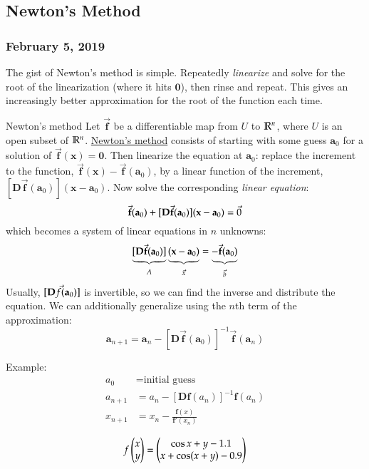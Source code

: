\subsection{Newton's Method}
\subsubsection*{February 5, 2019}

The gist of Newton's method is simple. Repeatedly \emph{linearize} and solve for the root of the linearization (where it hits $\bm{0}$), then rinse and repeat. This gives an increasingly better approximation for the root of the function each time. 

\begin{defn}{Newton's method}
Let $\vec{\bm{f}}$ be a differentiable map from $U$ to $\mathbb{R}^n$, where $U$ is an open subset of $\mathbb{R}^n$. \ul{Newton's method} consists of starting with some guess $\bm{a}_0$ for a solution of $\vec{\bm{f}}(\bm{x})=\bm{0}$. Then linearize the equation at $\bm{a}_0$: replace the increment to the function, $\vec{\bm{f}}(\bm{x})-\vec{\bm{f}}(\bm{a}_0)$, by a linear function of the increment, $[\bm{D}\vec{\bm{f}}(\bm{a}_0)](\bm{x}-\bm{a}_0)$. Now solve the corresponding \emph{linear equation}:
  \begin{equation}
  	\vec{\textbf{f}}(\textbf{a}_0)+[\textbf{D}\vec{\textbf{f}}(\textbf{a}_0)](\textbf{x}-\textbf{a}_0)=\Vec{0}
  \end{equation}
  which becomes a system of linear equations in $n$ unknowns: 
  \begin{equation}
  	\underbrace{[\textbf{D\ensuremath{\Vec{\textbf{f}}}}(\textbf{a}_0)]}_{A}\underbrace{(\textbf{x}-\textbf{a}_0)}_{\Vec{x}}=\underbrace{-\vec{\textbf{f}}(\textbf{a}_0)}_{\vec{b}}
  \end{equation}
  Usually, $[\textbf{D\ensuremath{\Vec{f}}}(\textbf{a}_0)]$ is invertible, so we can find the inverse and distribute the equation. We can additionally generalize using the $n$th term of the approximation:  
  \begin{equation}
  	\bm{a}_{n+1}=\bm{a}_n-[\bm{D}\vec{\bm{f}}(\bm{a}_0)]^{-1}\vec{\bm{f}}(\bm{a}_n)
  \end{equation}
\end{defn}

Example:
  \begin{align*}
    a_0 &= \text{initial guess} \\
    a_{n+1} &= a_n - [\bm{D}\bm{f}(a_n)]^{-1} \bm{f}(a_n) \\
    x_{n+1} &= x_n - \frac{\bm{f}(x)}{\bm{f}'(x_n)}
  \end{align*}


\example
\[f\begin{pmatrix} x \\ y \end{pmatrix} = \begin{pmatrix} \cos x + y - 1.1 \\  x + \cos (x + y) - 0.9 \end{pmatrix}\]
